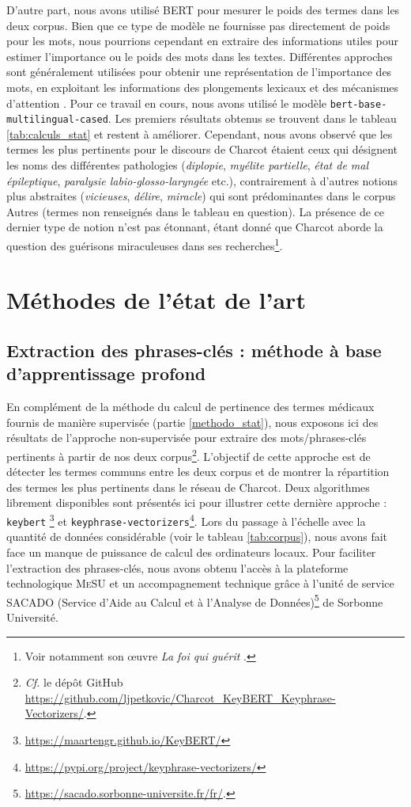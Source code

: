 D'autre part, nous avons utilisé \textsc{BERT} pour mesurer le poids des termes dans les deux corpus. Bien que ce type de modèle ne fournisse pas directement de poids pour les mots, nous pourrions cependant en extraire des informations utiles pour estimer l'importance ou le poids des mots dans les textes. Différentes approches sont généralement utilisées pour obtenir une représentation de l'importance des mots, en exploitant les informations des plongements lexicaux et des mécanismes d'attention \citep{vaswani2023}. Pour ce travail en cours, nous avons utilisé le modèle \texttt{bert-base-multilingual-cased}. Les premiers résultats obtenus se trouvent dans le tableau \ref{tab:calculs_stat} et restent à améliorer. Cependant, nous avons observé que les termes les plus pertinents pour le discours de Charcot étaient ceux qui désignent les noms des différentes pathologies (\textit{diplopie}, \textit{myélite partielle}, \textit{état de mal épileptique}, \textit{paralysie labio-glosso-laryngée} etc.), contrairement à d'autres notions plus abstraites (\textit{vicieuses}, \textit{délire}, \textit{miracle}) qui sont prédominantes dans le corpus
\og{}Autres\fg{} (termes non renseignés dans le tableau en question). La présence de ce dernier type de notion n'est pas étonnant, étant donné que Charcot aborde la question des guérisons miraculeuses dans ses recherches\footnote{Voir notamment son \oe{}uvre \textit{La foi qui guérit} \citep{charcot1897foi}.}. 


\chapter{Méthodes de l'état de l'art}
\section{Extraction des phrases-clés : méthode à base d'apprentissage profond}
En complément de la méthode du calcul de pertinence des termes médicaux fournis de manière supervisée (partie \ref{methodo_stat}), nous exposons ici des résultats de l'approche non-supervisée pour extraire des mots/phrases-clés  pertinents à partir de nos deux corpus\footnote{\textit{Cf.} le dépôt GitHub \url{https://github.com/ljpetkovic/Charcot\_KeyBERT\_Keyphrase-Vectorizers/}.}. L'objectif de cette approche est de détecter les termes communs entre les deux corpus et de montrer la répartition des termes les plus pertinents dans le réseau de Charcot. Deux algorithmes librement disponibles sont présentés ici pour illustrer cette dernière approche : \texttt{keybert} \citep{grootendorst2023}\footnote{\url{https://maartengr.github.io/KeyBERT/}} et \texttt{keyphrase-vectorizers}\footnote{\url{https://pypi.org/project/keyphrase-vectorizers/}}. Lors du passage à l'échelle avec la quantité de données considérable (voir le tableau \ref{tab:corpus}), nous avons fait face un manque de puissance de calcul des ordinateurs locaux. Pour faciliter l'extraction des phrases-clés, nous avons obtenu l'accès à la plateforme technologique \textsc{MeSU} et un accompagnement technique grâce à l'unité de service \textsc{SACADO} (Service d'Aide au Calcul et à l'Analyse de Données)\footnote{\url{https://sacado.sorbonne-universite.fr/fr/}.} de Sorbonne Université.

